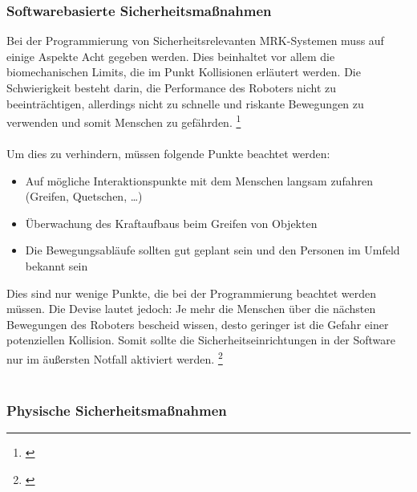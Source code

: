 \documentclass[titlepage,12pt,twoside]{article}
\begin{document}
\subsubsection{Softwarebasierte Sicherheitsmaßnahmen}
Bei der Programmierung von Sicherheitsrelevanten MRK-Systemen muss auf einige 
Aspekte Acht gegeben werden. Dies beinhaltet vor allem die biomechanischen Limits, 
die im Punkt Kollisionen erläutert werden. Die Schwierigkeit besteht darin, die 
Performance des Roboters nicht zu beeinträchtigen, allerdings nicht zu schnelle 
und riskante Bewegungen zu verwenden und somit Menschen zu gefährden. \footnote{\cite{Frauenhofer21}} \\
\\
\hfill \break
Um dies zu verhindern, müssen folgende Punkte beachtet werden: \\
\begin{itemize}
	\item Auf mögliche Interaktionspunkte mit dem Menschen langsam zufahren 
	(Greifen, Quetschen, …)
	\item Überwachung des Kraftaufbaus beim Greifen von Objekten
	\item Die Bewegungsabläufe sollten gut geplant sein und den Personen im Umfeld bekannt sein
\end{itemize}
\hfill \break
Dies sind nur wenige Punkte, die bei der Programmierung beachtet werden müssen. 
Die Devise lautet jedoch: Je mehr die Menschen über die nächsten Bewegungen des 
Roboters bescheid wissen, desto geringer ist die Gefahr einer potenziellen 
Kollision. Somit sollte die Sicherheitseinrichtungen in der Software nur im 
äußersten Notfall aktiviert werden. \footnote{\cite{Frauenhofer21}} \\
\\
\subsubsection{Physische Sicherheitsmaßnahmen}
\end{document}
